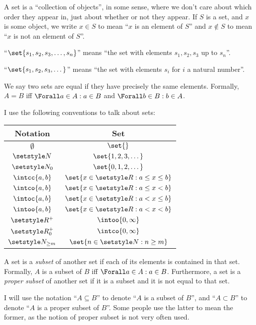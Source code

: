 A set is a ``collection of objects'', in some sense, where we don't care about
which order they appear in, just about whether or not they appear. If \(S\) is a
set, and \(x\) is some object, we write \(x \in S\) to mean ``\(x\) is an
element of \(S\)'' and \(x \notin S\) to mean ``\(x\) is not an element of
\(S\)''.

``\(\set{s_1, s_2, s_3, \dotsc, s_n}\)'' means ``the set with elements
\(s_1, s_2, s_3\) up to \(s_n\)''.

``\(\set{s_1, s_2, s_3, \dotsc}\)'' means ``the set with elements \(s_i\) for
\(i\) a natural number''.

We say two sets are equal if they have precisely the same elements. Formally,
\(A = B\) iff \(\Forall a \in A: a \in B\) and \(\Forall b \in B: b \in A\).

I use the following conventions to talk about sets:
\begin{center}
 \begin{tabular}{cc}
  \toprule
  \bfseries Notation & \bfseries Set \\
  \midrule
  \(\emptyset\) & \(\set{}\) \\
  \(\Naturals\)
  & \(\set{1, 2, 3, \dotsc}\) \\
  \(\Naturals_0\)
  & \(\set{0, 1, 2, \dotsc}\) \\
  \(\intcc{a, b}\) & \(\set{x \in \Reals : a \le x \le b}\) \\
  \(\intco{a, b}\) & \(\set{x \in \Reals : a \le x < b}\) \\
  \(\intoc{a, b}\) & \(\set{x \in \Reals : a < x \le b}\) \\
  \(\intoo{a, b}\) & \(\set{x \in \Reals : a < x < b}\) \\
  \(\Reals^+\) & \(\intoo{0, \infty}\) \\
  \(\Reals_0^+\) & \(\intco{0, \infty}\) \\
  \(\Naturals_{\ge m}\) & \(\set{n \in \Naturals : n \ge m}\) \\
  \bottomrule
 \end{tabular}
\end{center}
A set is a \emph{subset} of another set if each of its elements is contained in
that set. Formally, \(A\) is a subset of \(B\) iff \(\Forall a \in A : a \in
B\). Furthermore, a set is a \emph{proper subset} of another set if it is a
subset and it is not equal to that set.

I will use the notation ``\(A \subseteq B\)'' to denote ``\(A\) is a subset
of \(B\)'', and ``\(A \subset B\)'' to denote ``\(A\) is a proper subset of
\(B\)''. Some people use the latter to mean the former, as the notion of proper
subset is not very often used.

